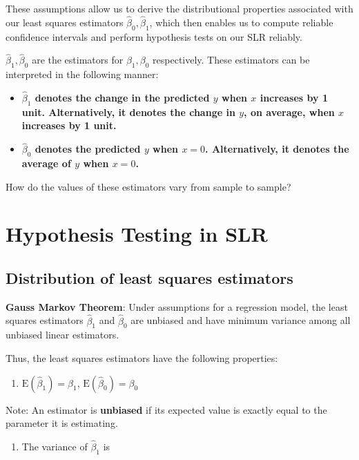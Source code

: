 \documentclass[
]{book}
\providecommand{\tightlist}{%
  \setlength{\itemsep}{0pt}\setlength{\parskip}{0pt}}
\begin{document}
These assumptions allow us to derive the distributional properties associated with our least squares estimators \(\hat{\beta}_0, \hat{\beta}_1\), which then enables us to compute reliable confidence intervals and perform hypothesis tests on our SLR reliably.

\(\hat{\beta}_1,\hat{\beta}_0\) are the estimators for \(\beta_1,\beta_0\) respectively. These estimators can be interpreted in the following manner:

\begin{itemize}
\tightlist
\item
  \textbf{\(\hat{\beta}_1\) denotes the change in the predicted \(y\) when \(x\) increases by 1 unit. Alternatively, it denotes the change in \(y\), on average, when \(x\) increases by 1 unit.}
\item
  \textbf{\(\hat{\beta}_0\) denotes the predicted \(y\) when \(x=0\). Alternatively, it denotes the average of \(y\) when \(x=0\).}
\end{itemize}

How do the values of these estimators vary from sample to sample?

\section{Hypothesis Testing in SLR}\label{hypothesis-testing-in-slr}

\subsection{Distribution of least squares estimators}\label{distribution-of-least-squares-estimators}

\textbf{Gauss Markov Theorem}: Under assumptions for a regression model, the least squares estimators \(\hat{\beta}_1\) and \(\hat{\beta}_0\) are unbiased and have minimum variance among all unbiased linear estimators.

Thus, the least squares estimators have the following properties:

\begin{enumerate}
\def\labelenumi{\arabic{enumi}.}
\tightlist
\item
  \(\mbox{E}(\hat{\beta}_1) = \beta_1\), \(\mbox{E}(\hat{\beta}_0) = \beta_0\)
\end{enumerate}

Note: An estimator is \textbf{unbiased} if its expected value is exactly equal to the parameter it is estimating.

\begin{enumerate}
\def\labelenumi{\arabic{enumi}.}
\setcounter{enumi}{1}
\tightlist
\item
  The variance of \(\hat{\beta}_1\) is
\end{enumerate}
\end{document}
